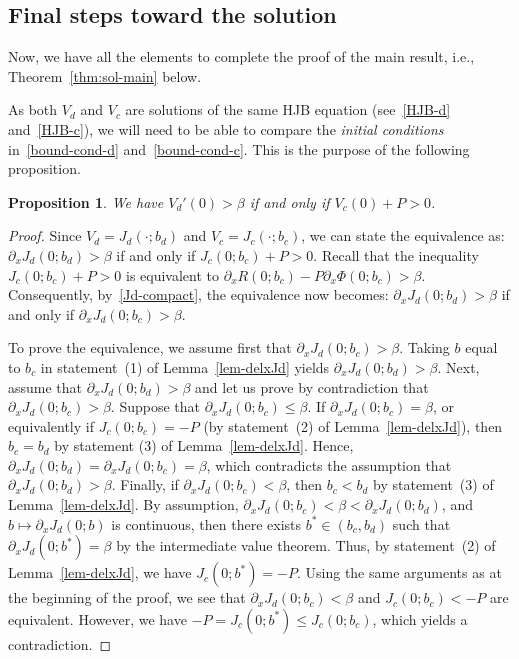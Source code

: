 \documentclass[11pt,reqno]{amsart}
\newtheorem{proposition}[theorem]{Proposition}
\newcommand{\delx}{\partial_x}
\renewcommand{\leq}{\leqslant}
\begin{document}
\subsection{Final steps toward the solution}\label{subsec:result}

Now, we have all the elements to complete the proof of the main result, i.e., Theorem~\ref{thm:sol-main} below.

As both $V_d$ and $V_c$ are solutions of the same HJB equation (see~\eqref{HJB-d} and~\eqref{HJB-c}), we will need to be able to compare the \textit{initial conditions} in~\eqref{bound-cond-d} and~\eqref{bound-cond-c}. This is the purpose of the following proposition.
\begin{proposition}\label{prop:equiv}
    We have $V_d'(0) > \beta$ if and only if $V_c(0) + P > 0$.
\end{proposition}
\begin{proof}
    Since $V_d = J_d(\cdot;b_d)$ and $V_c = J_c(\cdot;b_c)$, we can state the equivalence as: $\delx J_d(0;b_d) > \beta$ if and only if $J_c(0;b_c) + P > 0$. Recall that the inequality $J_c(0;b_c) + P > 0$ is equivalent to $\delx R(0;b_c) - P\delx\Phi(0;b_c) > \beta$. Consequently, by~\eqref{Jd-compact}, the equivalence now becomes: $\delx J_d(0;b_d) > \beta$ if and only if $\delx J_d(0;b_c) > \beta$.
    
    To prove the equivalence, we assume first that $\delx J_d(0;b_c) > \beta$. Taking $b$ equal to $b_c$ in statement~(1) of Lemma~\ref{lem-delxJd} yields $\delx J_d(0;b_d) > \beta$. Next, assume that $\delx J_d(0;b_d) > \beta$ and let us prove by contradiction that $\delx J_d(0;b_c) > \beta$. Suppose that $\delx J_d(0;b_c) \leq \beta$. If $\delx J_d(0;b_c) =\beta$, or equivalently if $J_c(0;b_c) = -P$ (by statement~(2) of Lemma~\ref{lem-delxJd}), then $b_c = b_d$ by statement (3) of Lemma~\ref{lem-delxJd}. Hence, $\delx J_d(0;b_d) = \delx J_d(0;b_c) = \beta$, which contradicts the assumption that $\delx J_d(0;b_d) > \beta$.
    Finally, if $\delx J_d(0;b_c) < \beta$, then $b_c < b_d$ by statement~(3) of Lemma~\ref{lem-delxJd}. By assumption, $\delx J_d(0;b_c) < \beta < \delx J_d(0;b_d)$, and $b\mapsto \delx J_d(0;b)$ is continuous, then there exists $b^*\in(b_c,b_d)$ such that $\delx J_d(0;b^*) = \beta$ by the intermediate value theorem. Thus, by statement~(2) of Lemma~\ref{lem-delxJd}, we have $J_c(0;b^*) = -P$. Using the same arguments as at the beginning of the proof, we see that $\delx J_d(0;b_c) < \beta$ and $J_c(0;b_c) < -P$ are equivalent. However, we have $-P = J_c(0;b^*) \leq J_c(0;b_c)$, which yields a contradiction.
\end{proof}
\end{document}
